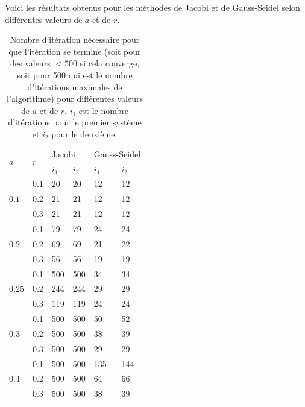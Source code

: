 Voici les résultats obtenus pour les méthodes de Jacobi et de Gauss-Seidel selon différentes valeurs de $a$ et de $r$.

\begin{table}
  \centering
  \begin{tabular}{|l|l|l|l|l|l|}
    \hline
    \multirow{2}{*}{$a$} & \multirow{2}{*}{$r$} & \multicolumn{2}{l|}{Jacobi} & \multicolumn{2}{l|}{Gauss-Seidel}\\
    \cline{3-6}
      &  & $i_1$ & $i_2$ & $i_1$ & $i_2$\\
    \hline
    \multirow{3}{*}{$0.1$} & 0.1 & 20 & 20 & 12 & 12 \\
    \cline{2-6}
      & 0.2 & 21 & 21 & 12 & 12 \\
      \cline{2-6}
      & 0.3 & 21 & 21 & 12 & 12 \\
    \hline
    \multirow{3}{*}{$0.2$} & 0.1 & 79 & 79 & 24 & 24 \\
    \cline{2-6}
      & 0.2 & 69 & 69 & 21 & 22 \\
      \cline{2-6}
      & 0.3 & 56 & 56 & 19 & 19 \\
    \hline
    \multirow{3}{*}{$0.25$} & 0.1 & 500 & 500 & 34 & 34 \\
    \cline{2-6}
      & 0.2 & 244 & 244 & 29 & 29 \\
      \cline{2-6}
      & 0.3 & 119 & 119 & 24 & 24\\
    \hline
    \multirow{3}{*}{$0.3$} & 0.1 & 500 & 500 & 50 & 52 \\
    \cline{2-6}
      & 0.2 & 500 & 500 & 38 & 39 \\
      \cline{2-6}
      & 0.3 & 500 & 500 & 29 & 29 \\
      \hline
      \multirow{3}{*}{$0.4$} & 0.1 & 500 & 500 & 135 & 144 \\
    \cline{2-6}
      & 0.2 & 500 & 500 & 64 & 66 \\
      \cline{2-6}
      & 0.3 & 500 & 500 & 38 & 39 \\
      \hline
  \end{tabular}
  \caption{Nombre d'itération nécessaire pour que l'itération se termine (soit pour des valeurs $<500$ si cela converge, soit pour 500 qui est le nombre d'itérations maximales de l'algorithme) pour différentes valeurs de $a$ et de $r$.
  $i_1$ est le nombre d'itérations pour le premier système et $i_2$ pour le deuxième.}
  \label{tab:iterQ3JvsGS}
\end{table}


